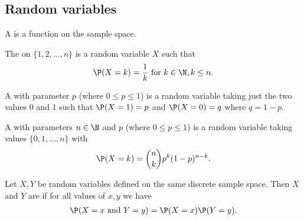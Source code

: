 \documentclass{article}
\begin{document}
\subsection{Random variables}
\begin{definition}
    A  is a function on the sample space.
\end{definition}
\begin{definition}
    The  on $\{1,2,...,n\}$ is a random variable $X$ such that
    \begin{align*}
        \P(X=k)=\frac{1}{k}\text{ for }k\in\N, k\leq n.
    \end{align*}
\end{definition}
\begin{definition}
    A  with parameter $p$ (where $0\leq p\leq 1$) is a random variable
    taking just the two values $0$ and $1$ such that $\P(X=1)=p$ and $\P(X=0)=q$ where $q=1-p$.
\end{definition}
\begin{definition}
    A  with parameters $n\in\N$ and $p$ (where $0\leq p\leq 1$) is a
    random variable taking values $\{0,1,...,n\}$ with
    \begin{align*}
        \P(X=k)=\binom{n}{k}p^k(1-p)^{n-k}.
    \end{align*}
\end{definition}
\begin{definition}
    Let $X,Y$ be random variables defined on the same discrete sample space. 
    Then $X$ and $Y$ are  if for all values of $x,y$ we have
    \begin{align*}
        \P(X=x \text{ and } Y=y) = \P(X=x)\P(Y = y).
    \end{align*}
\end{definition}
\end{document}
